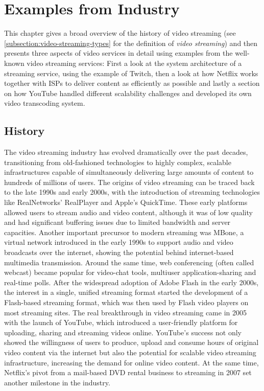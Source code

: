 \chapter{Examples from Industry}\label{chapter:examples}

This chapter gives a broad overview of the history of video streaming (see \autoref{subsection:video-streaming-types} for the definition of \textit{video streaming}) and then presents three aspects of video services in detail using examples from the well-known video streaming services: First a look at the system architecture of a streaming service, using the example of Twitch, then a look at how Netflix works together with \ac{ISPs} to deliver content as efficiently as possible and lastly a section on how YouTube handled different scalability challenges and developed its own video transcoding system.     

\section{History}
The video streaming industry has evolved dramatically over the past decades, transitioning from old-fashioned technologies to highly complex, scalable infrastructures capable of simultaneously delivering large amounts of content to hundreds of millions of users. The origins of video streaming can be traced back to the late 1990s and early 2000s, with the introduction of streaming technologies like RealNetworks' RealPlayer and Apple's QuickTime. These early platforms allowed users to stream audio and video content, although it was of low quality and had significant buffering issues due to limited bandwidth and server capacities.
Another important precursor to modern streaming was \ac{MBone}, a virtual network introduced in the early 1990s to support audio and video broadcasts over the internet, showing the potential behind internet-based multimedia transmission. Around the same time, web conferencing (often called webcast) became popular for video-chat tools, multiuser application-sharing and real-time polls. 
After the widespread adoption of Adobe Flash in the early 2000s, the interest in a single, unified streaming format started the development of a Flash-based streaming format, which was then used by Flash video players on most streaming sites.
The real breakthrough in video streaming came in 2005 with the launch of YouTube, which introduced a user-friendly platform for uploading, sharing and streaming videos online. YouTube's success not only showed the willingness of users to produce, upload and consume hours of original video content via the internet but also the potential for scalable video streaming infrastructure, increasing the demand for online video content. At the same time, Netflix's pivot from a mail-based DVD rental business to streaming in 2007 set another milestone in the industry. 

